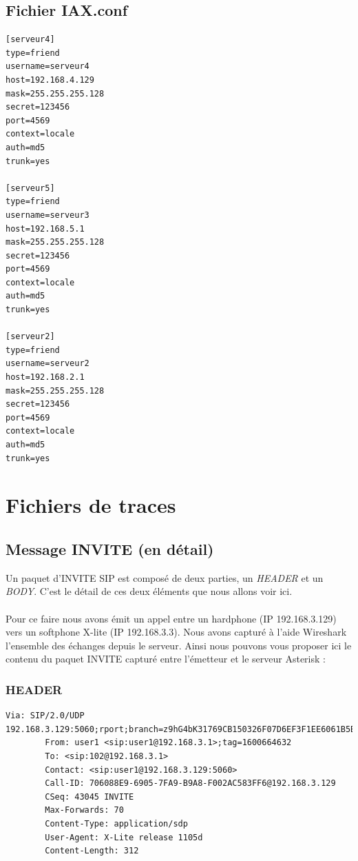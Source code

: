 \documentclass[12pt,a4paper,notitlepage]{article}
\begin{document}
\subsection{Fichier IAX.conf}

\begin{lstlisting}[title=Fichier IAX.conf]
[serveur4]
type=friend
username=serveur4
host=192.168.4.129
mask=255.255.255.128
secret=123456
port=4569
context=locale
auth=md5
trunk=yes

[serveur5]
type=friend
username=serveur3
host=192.168.5.1
mask=255.255.255.128
secret=123456
port=4569
context=locale
auth=md5
trunk=yes

[serveur2]
type=friend
username=serveur2
host=192.168.2.1
mask=255.255.255.128
secret=123456
port=4569
context=locale
auth=md5
trunk=yes
\end{lstlisting}


\section{Fichiers de traces}
\subsection{Message INVITE (en détail)}
Un paquet d'INVITE SIP est composé de deux parties, un \textit{HEADER} et un  \textit{BODY}. C'est le détail de ces deux éléments que nous allons voir ici. 

\paragraph{}Pour ce faire nous avons émit un appel entre un hardphone (IP 192.168.3.129) vers un softphone X-lite (IP 192.168.3.3). Nous avons capturé à l'aide Wireshark l'ensemble des échanges depuis le serveur. Ainsi nous pouvons vous proposer ici le contenu du paquet INVITE capturé entre l'émetteur et le serveur Asterisk :
\subsubsection{HEADER}
\begin{lstlisting}[title=Contenu du HEADER d'un paquet INVITE de SIP]
 Via: SIP/2.0/UDP 192.168.3.129:5060;rport;branch=z9hG4bK31769CB150326F07D6EF3F1EE6061B5B
        From: user1 <sip:user1@192.168.3.1>;tag=1600664632
        To: <sip:102@192.168.3.1>
        Contact: <sip:user1@192.168.3.129:5060>
        Call-ID: 706088E9-6905-7FA9-B9A8-F002AC583FF6@192.168.3.129
        CSeq: 43045 INVITE
        Max-Forwards: 70
        Content-Type: application/sdp
        User-Agent: X-Lite release 1105d
        Content-Length: 312
\end{lstlisting}
\end{document}
